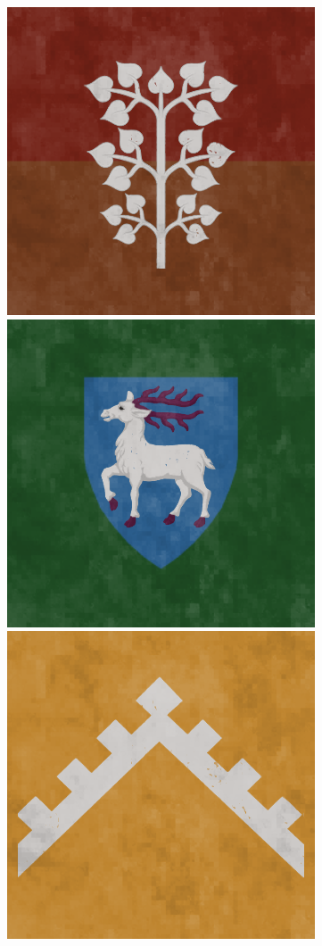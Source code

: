 \begin{figure}[!ht]
        \includegraphics[scale=0.25]{img/flag/locals.png}
        \includegraphics[scale=0.25]{img/flag/lormark.png}
        \includegraphics[scale=0.25]{img/flag/sintria.png}

\end{figure}
